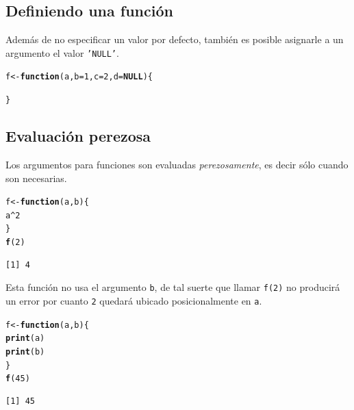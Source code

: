 \documentclass{article}\usepackage[]{graphicx}\usepackage[]{color}
\makeatletter
\newcommand{\hlnum}[1]{\textcolor[rgb]{0.686,0.059,0.569}{#1}}%
\newcommand{\hlopt}[1]{\textcolor[rgb]{0,0,0}{#1}}%
\newcommand{\hlstd}[1]{\textcolor[rgb]{0.345,0.345,0.345}{#1}}%
\newcommand{\hlkwa}[1]{\textcolor[rgb]{0.161,0.373,0.58}{\textbf{#1}}}%
\newcommand{\hlkwb}[1]{\textcolor[rgb]{0.69,0.353,0.396}{#1}}%
\newcommand{\hlkwc}[1]{\textcolor[rgb]{0.333,0.667,0.333}{#1}}%
\newcommand{\hlkwd}[1]{\textcolor[rgb]{0.737,0.353,0.396}{\textbf{#1}}}%
\newenvironment{kframe}{%
 \def\at@end@of@kframe{}%
 \ifinner\ifhmode%
  \def\at@end@of@kframe{\end{minipage}}%
  \begin{minipage}{\columnwidth}%
 \fi\fi%
 \def\FrameCommand##1{\hskip\@totalleftmargin \hskip-\fboxsep
 \colorbox{shadecolor}{##1}\hskip-\fboxsep
     \hskip-\linewidth \hskip-\@totalleftmargin \hskip\columnwidth}%
 \MakeFramed {\advance\hsize-\width
   \@totalleftmargin\z@ \linewidth\hsize
   \@setminipage}}%
 {\par\unskip\endMakeFramed%
 \at@end@of@kframe}
\newenvironment{knitrout}{}{} %
\makeatother
\begin{document}
  \subsection{Definiendo una función}
  Además de no especificar un valor por defecto, también es posible asignarle a un argumento el valor \texttt{'NULL'}. 
\begin{knitrout}
\color{fgcolor}\begin{kframe}
\begin{alltt}
  \hlstd{f} \hlkwb{<-} \hlkwa{function}\hlstd{(}\hlkwc{a}\hlstd{,} \hlkwc{b} \hlstd{=} \hlnum{1}\hlstd{,} \hlkwc{c} \hlstd{=} \hlnum{2}\hlstd{,} \hlkwc{d} \hlstd{=} \hlkwa{NULL}\hlstd{)\{}

  \hlstd{\}}
\end{alltt}
\end{kframe}
\end{knitrout}
  
  \subsection{Evaluación perezosa}
  Los argumentos para funciones son evaluadas \emph{perezosamente}, es decir sólo cuando son necesarias.
\begin{knitrout}
\color{fgcolor}\begin{kframe}
\begin{alltt}
  \hlstd{f} \hlkwb{<-} \hlkwa{function}\hlstd{(}\hlkwc{a}\hlstd{,} \hlkwc{b}\hlstd{)\{}
    \hlstd{a}\hlopt{^}\hlnum{2}
  \hlstd{\}}
  \hlkwd{f}\hlstd{(}\hlnum{2}\hlstd{)}
\end{alltt}
\begin{verbatim}
[1] 4
\end{verbatim}
\end{kframe}
\end{knitrout}
  Esta función no usa el argumento \texttt{b}, de tal suerte que llamar \texttt{f(2)} no producirá un error por cuanto \texttt{2} quedará ubicado posicionalmente en \texttt{a}.  
\begin{knitrout}
\color{fgcolor}\begin{kframe}
\begin{alltt}
  \hlstd{f} \hlkwb{<-} \hlkwa{function}\hlstd{(}\hlkwc{a}\hlstd{,} \hlkwc{b}\hlstd{)\{}
    \hlkwd{print}\hlstd{(a)}
    \hlkwd{print}\hlstd{(b)}
  \hlstd{\}}
  \hlkwd{f}\hlstd{(}\hlnum{45}\hlstd{)}
\end{alltt}
\begin{verbatim}
[1] 45
\end{verbatim}
\end{kframe}
\end{knitrout}
  
\end{document}
